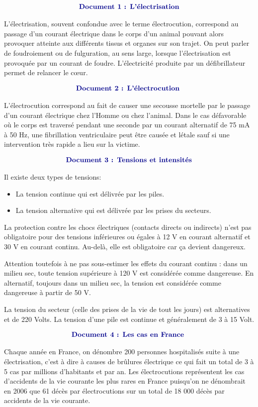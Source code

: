 \documentclass[10pt]{article}
\newcommand{\doctitle}[1]{ 
\begin{align*}
	\centering\textbf{\color{DarkBlue} {#1}}
\end{align*}	
}
\newcommand{\docOne}{ 
	\large
	\doctitle{Document 1 : L'électrisation}

		L'électrisation, souvent confondue avec le terme électrocution, correspond au passage d'un courant
		électrique dans le corps d'un animal pouvant alors provoquer atteinte aux différents
		tissus et organes sur son trajet.
		On peut parler de foudroiement ou de fulguration, au sens large, lorsque l'électrisation est
		provoquée par un courant de foudre. L'électricité produite par un défibrillateur permet de relancer le cœur.
		}
\newcommand{\docTwo}{ 
	\large
	\doctitle{Document 2 : L'électrocution }  
		
	L'électrocution correspond au fait de causer une secousse mortelle par le passage d'un courant
	électrique chez l'Homme ou chez l'animal. Dans le cas défavorable où le corps est traversé pendant
	une seconde par un courant alternatif de 75 mA à 50  Hz, une fibrillation ventriculaire peut
	être causée et létale sauf si une intervention très rapide a lieu sur la victime.
}
\newcommand{\docFour}{
	\large
	\doctitle{Document 4 : Les cas en France } 
		
		Chaque année en France, on dénombre 200 personnes hospitalisés suite à une électrisation, c'est à
		dire à causes de brûlures électrique ce qui fait un total de 3 à 5 cas par millions d'habitants et par
		an.
		Les électrocutions représentent les cas d'accidents de la vie courante les plus rares en France
		puisqu'on ne dénombrait en 2006 que 61 décès par électrocutions sur un total de 18 000 décès par
		accidents de la vie courante.
}
\newcommand{\docThree}{
	\large
	\doctitle{Document 3 : Tensions et intensités}

	Il existe deux types de tensions: 
	\begin{itemize}
		\item La tension continue qui est délivrée par les piles.
		\item La tension alternative qui est délivrée par les prises du secteurs.
	\end{itemize}
	La protection contre les chocs électriques (contacts directs ou indirects) n'est pas obligatoire pour
	des tensions inférieures ou égales à 12 V en courant alternatif et 30 V en courant continu. Au-delà,
	elle est obligatoire car ça devient dangereux.

	Attention toutefois à ne pas sous-estimer les effets du courant continu : dans un
	milieu sec, toute tension supérieure à 120 V est considérée comme dangereuse.
	En alternatif, toujours dans un milieu sec, la tension est considérée comme dangereuse à partir de
	50 V.

	La tension du secteur (celle des prises de la vie de tout les jours) est alternatives et de 220 Volts.
	La tension d'une pile est continue et généralement de 3 à 15 Volt.
}
\begin{document}

\begin{question}
	\end{question}

		\begin{minipage}[t]{0.45\textwidth}
			\docOne
		\end{minipage}
		\hspace{10pt}
		\begin{minipage}[t]{0.45\textwidth}
			\docTwo
		\end{minipage}	

\begin{minipage}[t]{0.45\textwidth}
	\docThree
\end{minipage}
\hspace{10pt}
\begin{minipage}[t]{0.45\textwidth}
	\docFour 
\end{minipage}
\end{document}
